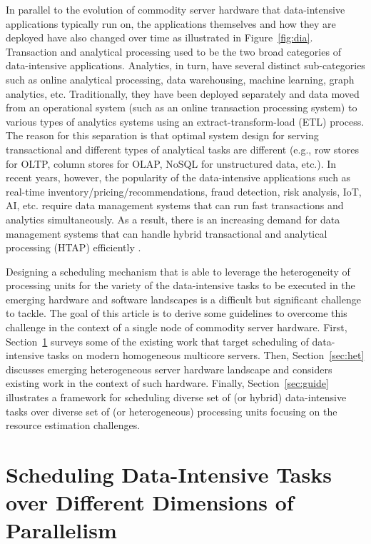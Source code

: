 \documentclass[11pt,dvipdfm]{article}
\newcommand{\reffig}[1]{Figure~\ref{fig:#1}}
\newcommand{\refsec}[1]{Section~\ref{sec:#1}}
\begin{document}
In parallel to the evolution of commodity server hardware that data-intensive applications typically run on,
the applications themselves and how they are deployed have also changed over time as illustrated in \reffig{dia}. 
Transaction and analytical processing used to be the two broad categories of data-intensive applications.
Analytics, in turn, have several distinct sub-categories such as
online analytical processing, data warehousing, machine learning, graph analytics, etc.
Traditionally, they have been deployed separately and data moved from an operational system
(such as an online transaction processing system)
to various types of analytics systems using an extract-transform-load (ETL) process. 
The reason for this separation is that optimal system design for serving
transactional and different types of analytical tasks are different
(e.g., row stores for OLTP, column stores for OLAP, NoSQL for unstructured data, etc.).
In recent years, however, the popularity of the data-intensive applications such as 
real-time inventory/pricing/recommendations, fraud detection, risk analysis, IoT, AI, etc.
require data management systems that can run fast transactions and analytics simultaneously.
As a result, there is an increasing demand for data management systems that can handle
hybrid transactional and analytical processing (HTAP) efficiently \cite{OzcanTT17}.

Designing a scheduling mechanism that is able to leverage the heterogeneity of
processing units for the variety of the data-intensive tasks to be executed
in the emerging hardware and software landscapes is a difficult but significant challenge to tackle. 
The goal of this article is to derive some guidelines to overcome this challenge
in the context of a single node of commodity server hardware.
First, \refsec{sched}
surveys some of the existing work that target scheduling of data-intensive tasks on modern homogeneous multicore servers.
Then, \refsec{het} discusses emerging heterogeneous server hardware landscape and
considers existing work in the context of such hardware.
Finally, \refsec{guide}
illustrates a framework for scheduling diverse set of (or hybrid) data-intensive tasks
over diverse set of (or heterogeneous) processing units focusing on the resource estimation challenges.

\section{Scheduling Data-Intensive Tasks over Different Dimensions of Parallelism}
\label{sec:sched}
\end{document}
